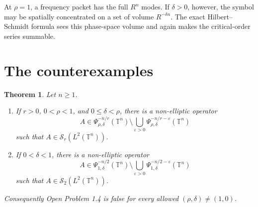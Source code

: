 \documentclass[11pt]{article}
\newtheorem{theorem}{Theorem}
\theoremstyle{remark}
\newcommand{\T}{\mathbb T}
\newcommand{\Schatten}{\mathscr S}
\begin{document}
At \(\rho=1\), a frequency packet has the full \(R^n\) modes. If \(\delta>0\),
however, the symbol may be spatially concentrated on a set of volume
\(R^{-\delta n}\). The exact Hilbert--Schmidt formula sees this phase-space
volume and again makes the critical-order series summable.

\section{The counterexamples}

\begin{theorem}\label{thm:main}
Let \(n\ge1\).
\begin{enumerate}
\item If \(r>0\), \(0<\rho<1\), and \(0\le\delta<\rho\), there is a
non-elliptic operator
\[
 A\in\Psi^{-n/r}_{\rho,\delta}(\T^n)
 \setminus\bigcup_{\varepsilon>0}
 \Psi^{-n/r-\varepsilon}_{\rho,\delta}(\T^n)
\]
such that \(A\in\Schatten_r(L^2(\T^n))\).
\item If \(0<\delta<1\), there is a non-elliptic operator
\[
 A\in\Psi^{-n/2}_{1,\delta}(\T^n)
 \setminus\bigcup_{\varepsilon>0}
 \Psi^{-n/2-\varepsilon}_{1,\delta}(\T^n)
\]
such that \(A\in\Schatten_2(L^2(\T^n))\).
\end{enumerate}
Consequently Open Problem 1.4 is false for every allowed
\((\rho,\delta)\ne(1,0)\).
\end{theorem}
\end{document}
